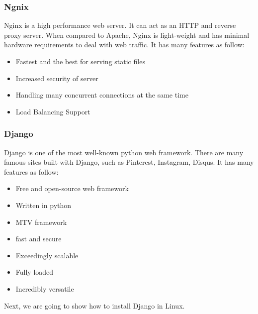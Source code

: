 \subsubsection{Ngnix}
Nginx is a high performance web server. It can act as an HTTP and reverse proxy server. When compared to Apache, Nginx is light-weight and has minimal hardware requirements to deal with web traffic. It has many features as follow:
\begin{itemize}
	\item Fastest and the best for serving static files
	\item Increased security of server 
	\item Handling many concurrent connections at the same time
	\item Load Balancing Support
\end{itemize}
\subsubsection{Django}
Django is one of the most well-known python web framework. There are many famous sites built with Django, such as Pinterest, Instagram, Disqus. It has many features as follow:
\begin{itemize}
	\item Free and open-source web framework
	\item Written in python
	\item MTV framework
	\item fast and secure
	\item Exceedingly scalable
	\item Fully loaded
	\item Incredibly versatile
\end{itemize}
Next, we are going to show how to install Django in Linux.
